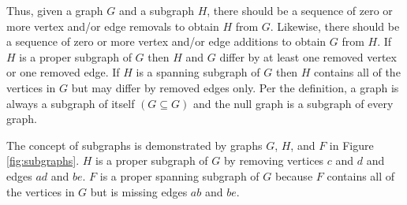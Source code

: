 Thus, given a graph \(G\) and a subgraph \(H\), there should be a sequence of zero or more vertex and/or edge
removals to obtain \(H\) from \(G\).  Likewise, there should be a sequence of zero or more vertex and/or edge
additions to obtain \(G\) from \(H\).  If \(H\) is a proper subgraph of \(G\) then \(H\) and \(G\) differ by at
least one removed vertex or one removed edge.  If \(H\) is a spanning subgraph of \(G\) then \(H\) contains all of
the vertices in \(G\) but may differ by removed edges only.  Per the definition, a graph is always a subgraph of
itself \((G\subseteq G)\) and the null graph is a subgraph of every graph.

The concept of subgraphs is demonstrated by graphs \(G\), \(H\), and \(F\) in Figure \ref{fig:subgraphs}.  \(H\) is
a proper subgraph of \(G\) by removing vertices \(c\) and \(d\) and edges \(ad\) and \(be\).  \(F\) is a proper
spanning subgraph of \(G\) because \(F\) contains all of the vertices in \(G\) but is missing edges \(ab\) and
\(be\).

